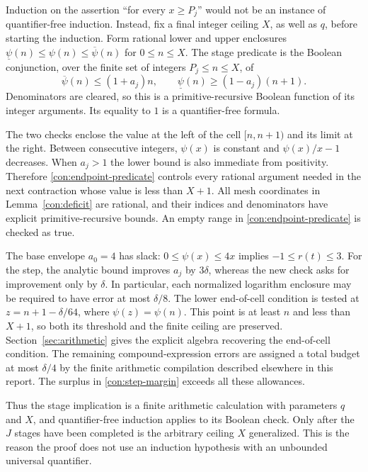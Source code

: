 Induction on the assertion ``for every $x\geq P_j$'' would not be an
instance of quantifier-free induction.  Instead, fix a final integer
ceiling $X$, as well as $q$, before starting the induction.  Form
rational lower and upper enclosures
$\underline\psi(n)\leq\psi(n)\leq\overline\psi(n)$
for $0\leq n\leq X$.  The stage predicate is the Boolean conjunction,
over the finite set of integers $P_j\leq n\leq X$, of
\begin{equation}
 \overline\psi(n)\leq(1+a_j)n,
 \qquad
 \underline\psi(n)\geq(1-a_j)(n+1).
 \label{con:endpoint-predicate}
\end{equation}
Denominators are cleared, so this is a primitive-recursive Boolean
function of its integer arguments.  Its equality to $1$ is a
quantifier-free formula.

The two checks enclose the value at the left of the cell $[n,n+1)$
and its limit at the right. Between consecutive integers, $\psi(x)$ is
constant and $\psi(x)/x-1$ decreases. When $a_j>1$ the lower bound
is also immediate from positivity. Therefore
\eqref{con:endpoint-predicate} controls every rational argument needed
in the next contraction whose value is less than $X+1$.
All mesh coordinates in Lemma~\ref{con:deficit} are rational, and their
indices and denominators have explicit primitive-recursive bounds.
An empty range in \eqref{con:endpoint-predicate} is checked as true.

The base envelope $a_0=4$ has slack: $0\leq\psi(x)\leq4x$ implies
$-1\leq r(t)\leq3$.  For the step, the analytic bound improves $a_j$
by $3\delta$, whereas the new check asks for improvement only by
$\delta$. In particular, each normalized logarithm enclosure may be
required to have error at most $\delta/8$. The lower end-of-cell
condition is tested at $z=n+1-\delta/64$, where $\psi(z)=\psi(n)$.
This point is at least $n$ and less than $X+1$, so both its threshold
and the finite ceiling are preserved. Section~\ref{sec:arithmetic}
gives the explicit algebra recovering the end-of-cell condition.
The remaining compound-expression errors are assigned a total budget
at most $\delta/4$ by the finite arithmetic compilation described
elsewhere in this report.  The surplus in
\eqref{con:step-margin} exceeds all these allowances.

Thus the stage implication is a finite arithmetic calculation with
parameters $q$ and $X$, and quantifier-free induction applies to its
Boolean check.  Only after the $J$ stages have been completed is the
arbitrary ceiling $X$ generalized.  This is the reason the proof does
not use an induction hypothesis with an unbounded universal quantifier.
